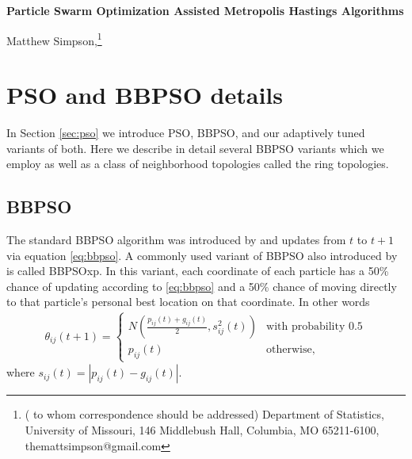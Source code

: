 \documentclass[12pt]{article}
\newcommand{\Appendix}
 {%
 \def\thesection{\Alph{section}}
 \def\thesubsection{\Alph{section}.\arabic{subsection}}
 \def\theequation{\Alph{section}.\arabic{equation}}
 \def\thefigure{\Alph{section}.\arabic{figure}}
 }
\begin{document}
\thispagestyle{empty} \baselineskip=28pt

\thispagestyle{empty} \baselineskip=28pt

%
\begin{center}
{\LARGE{\bf Particle Swarm Optimization Assisted Metropolis Hastings Algorithms}}
\end{center}


\baselineskip=12pt



\vskip 2mm
\blind
{
  \begin{center}
    Matthew Simpson,\footnote{(\baselineskip=10pt to whom correspondence should be addressed)
      Department of Statistics, University of Missouri,
      146 Middlebush Hall, Columbia, MO 65211-6100, themattsimpson@gmail.com}
  \end{center}
} \fi

\clearpage\pagebreak\newpage {}

\baselineskip=24pt

\Appendix
\section{PSO and BBPSO details}\label{app:psodetail}

In Section \ref{sec:pso} we introduce PSO, BBPSO, and our adaptively tuned variants of both. Here we describe in detail several BBPSO variants which we employ as well as a class of neighborhood topologies called the ring topologies.

\subsection{BBPSO}
The standard BBPSO algorithm was introduced by \citet{kennedy2003bare} and updates from $t$ to $t+1$ via equation \eqref{eq:bbpso}. A commonly used variant of BBPSO also introduced by \citet{kennedy2003bare} is called BBPSOxp. In this variant, each coordinate of each particle has a 50\% chance of updating according to \eqref{eq:bbpso} and a 50\% chance of moving directly to that particle's personal best location on that coordinate. In other words
\begin{align}\label{eq:bbpsoxp}
\theta_{ij}(t+1) = \begin{cases} N\left(\frac{p_{ij}(t) + g_{ij}(t)}{2}, s^2_{ij}(t)\right) & \mbox{with probability }0.5\\
p_{ij}(t) &\mbox{otherwise,}\end{cases}
\end{align}
where $s_{ij}(t) = |p_{ij}(t) - g_{ij}(t)|$.
\end{document}
